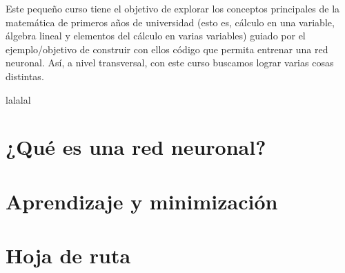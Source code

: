 Este pequeño curso tiene el objetivo de explorar los conceptos principales de la matemática de primeros años de universidad (esto es, cálculo en una variable, álgebra lineal y elementos del cálculo en varias variables) guiado por el ejemplo/objetivo de construir con ellos código que permita entrenar una red neuronal. Así, a nivel transversal, con este curso buscamos lograr varias cosas distintas.

lalalal


\section{¿Qué es una red neuronal?}

\section{Aprendizaje y minimización}

\section{Hoja de ruta}